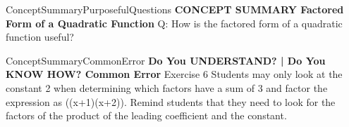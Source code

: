 \documentclass{article}
\newenvironment{te-addendum}[2]{}{}     %
\newcommand{\answer}[1]{}               %
\newcommand{\te}[1]{}                   %
\begin{document}
\begin{te-addendum}{ConceptSummary}{PurposefulQuestions}
\textbf{CONCEPT SUMMARY Factored Form of a Quadratic Function}
Q: How is the factored form of a quadratic function useful?
\answer{It can be used to find the zeros of the function, which are important when determining for what intervals the quadratic function is positive or negative.}
\te{Concept Summary, Do You Understand, and Do You Know How are available at SavvasRealize.com.}
\end{te-addendum}
\begin{te-addendum}{ConceptSummary}{CommonError}
\textbf{Do You UNDERSTAND? | Do You KNOW HOW? Common Error}
Exercise 6 Students may only look at the constant 2 when determining which factors have a sum of 3 and factor the expression as ((x+1)(x+2)). Remind students that they need to look for the factors of the product of the leading coefficient and the constant.
\te{Printed constant 2; the exercise has constant -2.}
\end{te-addendum}
\end{document}

